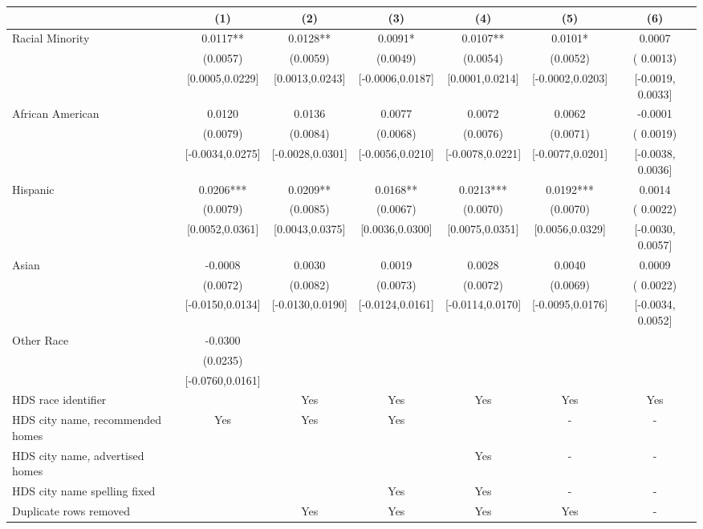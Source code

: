\begin{table}[htbp]
{\begin{tabular}{l*{6}{c}}
                    \cmidrule(lr){2-2}\cmidrule(lr){3-3}\cmidrule(lr){4-4}\cmidrule(lr){5-5}\cmidrule(lr){6-6}\cmidrule(lr){7-7}
                    &\multicolumn{1}{c}{(1)}   &\multicolumn{1}{c}{(2)}   &\multicolumn{1}{c}{(3)}   &\multicolumn{1}{c}{(4)}   &\multicolumn{1}{c}{(5)}   &\multicolumn{1}{c}{(6)}\\
\midrule
Racial Minority & 0.0117** & 0.0128** & 0.0091* & 0.0107** & 0.0101* & 0.0007 \\
 & (0.0057) & (0.0059) & (0.0049) & (0.0054) & (0.0052) & ( 0.0013) \\
 & [0.0005,0.0229] & [0.0013,0.0243] & [-0.0006,0.0187] & [0.0001,0.0214] & [-0.0002,0.0203] & [-0.0019,  0.0033] \\
\midrule
African American & 0.0120 & 0.0136 & 0.0077 & 0.0072 & 0.0062 & -0.0001 \\
 & (0.0079) & (0.0084) & (0.0068) & (0.0076) & (0.0071) & ( 0.0019) \\
 & [-0.0034,0.0275] & [-0.0028,0.0301] & [-0.0056,0.0210] & [-0.0078,0.0221] & [-0.0077,0.0201] & [-0.0038,  0.0036] \\
Hispanic & 0.0206*** & 0.0209** & 0.0168** & 0.0213*** & 0.0192*** & 0.0014 \\
 & (0.0079) & (0.0085) & (0.0067) & (0.0070) & (0.0070) & ( 0.0022) \\
 & [0.0052,0.0361] & [0.0043,0.0375] & [0.0036,0.0300] & [0.0075,0.0351] & [0.0056,0.0329] & [-0.0030,  0.0057] \\
Asian & -0.0008 & 0.0030 & 0.0019 & 0.0028 & 0.0040 & 0.0009 \\
 & (0.0072) & (0.0082) & (0.0073) & (0.0072) & (0.0069) & ( 0.0022) \\
 & [-0.0150,0.0134] & [-0.0130,0.0190] & [-0.0124,0.0161] & [-0.0114,0.0170] & [-0.0095,0.0176] & [-0.0034,  0.0052] \\
Other Race & -0.0300 &  &  &  &  &  \\
 & (0.0235) &  &  &  &  &  \\
 & [-0.0760,0.0161] &  &  &  &  &  \\
\midrule
HDS race identifier & & Yes & Yes & Yes & Yes & Yes \\
HDS city name, recommended homes & Yes & Yes & Yes & & - & -\\
HDS city name, advertised homes &  &  &  & Yes & - & -\\
HDS city name spelling fixed & & & Yes & Yes & - & -\\
Duplicate rows removed &  & Yes & Yes & Yes & Yes & - \\

\end{tabular}}
\end{table}

